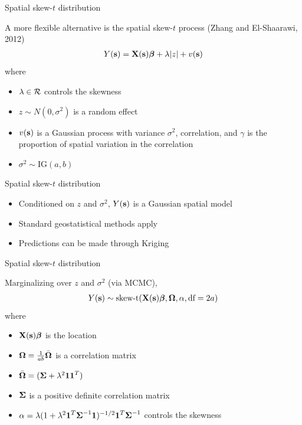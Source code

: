 \documentclass{beamer}
\begin{document}
\begin{frame}{Spatial skew-$t$ distribution}
\begin{adjustwidth}{1em}{0em}
  A more flexible alternative is the spatial skew-$t$ process (Zhang and El-Shaarawi, 2012)
  \begin{align*}
    Y(\mbox{\bf s}) = \mbox{\bf X}(\mbox{\bf s})\mbox{\boldmath $\beta$} + \lambda |z| + v(\mbox{\bf s})
  \end{align*}
  where
  \begin{itemize} \setlength{\itemsep}{0.25em}
    \item $\lambda \in {\cal R}$ controls the skewness
    \item $z \sim N(0, \sigma^2)$ is a random effect
    \item $v(\mbox{\bf s})$ is a Gaussian process with variance $\sigma^2$, \Matern correlation, and $\gamma$ is the proportion of spatial variation in the \Matern correlation
    \item $\sigma^2 \sim \text{IG}(a, b)$
  \end{itemize}
\end{adjustwidth}
\end{frame}

\begin{frame}{Spatial skew-$t$ distribution}
  \begin{itemize} \setlength{\itemsep}{1em}
    \item \alert{Conditioned} on $z$ and $\sigma^2$, $Y(\mbox{\bf s})$ is a Gaussian spatial model
    \item Standard geostatistical methods apply
    \item Predictions can be made through Kriging
  \end{itemize}
\end{frame}

\begin{frame}{Spatial skew-$t$ distribution}
\begin{adjustwidth}{1em}{0em}
  \alert{Marginalizing} over $z$ and $\sigma^2$ (via MCMC),
  \begin{align*}
    Y(\mbox{\bf s}) \sim \text{skew-t}(\mbox{\bf X}(\mbox{\bf s}) \mbox{\boldmath $\beta$}, \mbox{\boldmath $\Omega$}, \alpha, \text{df}=2a)
  \end{align*}
  where
  \begin{itemize} \setlength{\itemsep}{0.25em}
    \item $\mbox{\bf X}(\mbox{\bf s}) \mbox{\boldmath $\beta$}$ is the location
    \item $\mbox{\boldmath $\Omega$} = \frac{1}{ab} \bar{\mbox{\boldmath $\Omega$}}$ is a correlation matrix
    \item $\bar{\mbox{\boldmath $\Omega$}} = (\mbox{\boldmath $\Sigma$} + \lambda^2 \mbox{\boldmath $1$} \mbox{\boldmath $1$}^T)$
    \item $\mbox{\boldmath $\Sigma$}$ is a positive definite correlation matrix
    \item $\alpha = \lambda( 1 + \lambda^2 \mbox{\boldmath $1$}^T \mbox{\boldmath $\Sigma$}^{-1} \mbox{\boldmath $1$})^{-1/2} \mbox{\boldmath $1$}^T \mbox{\boldmath $\Sigma$}^{-1}$ controls the skewness
  \end{itemize}
\end{adjustwidth}
\end{frame}
\end{document}
